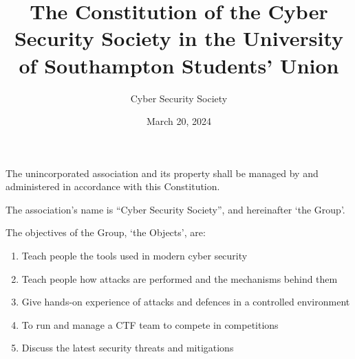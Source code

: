 \documentclass[12pt]{constitution}
\begin{document}

\title{The Constitution of the Cyber Security Society in the University of Southampton Students' Union}
\author{Cyber Security Society}
\date{March 20, 2024}
\maketitle


\label{clause:adoption-constitution}

The unincorporated association and its property shall be managed by and administered in accordance with this Constitution.


\label{clause:name}

The association's name is ``Cyber Security Society'', and hereinafter `the Group'.


\label{clause:objects}

The objectives of the Group, `the Objects', are:

\begin{enumerate}
    \item Teach people the tools used in modern cyber security
    \item Teach people how attacks are performed and the mechanisms behind them
    \item Give hands-on experience of attacks and defences in a controlled environment
    \item To run and manage a CTF team to compete in competitions
    \item Discuss the latest security threats and mitigations
\end{enumerate}


\label{clause:membership}
\end{document}
